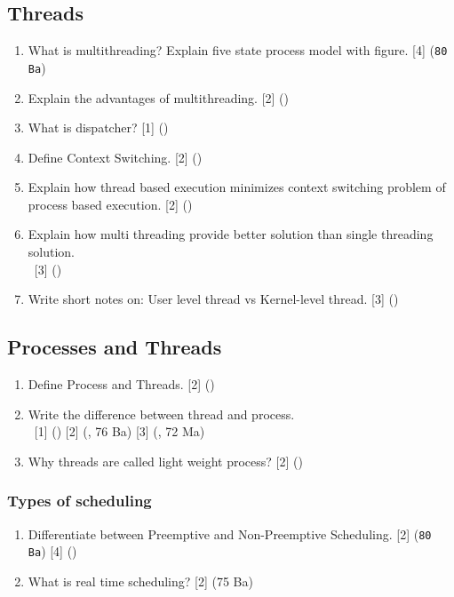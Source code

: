 \documentclass[12pt]{article}
\newcommand{\enter}{\\\textcolor{white}{1}}
\begin{document}
	\subsection{Threads}
		\begin{enumerate}[noitemsep, topsep = 0pt]
			\item What is multithreading? Explain five state process model with figure. \hfill [4] (\texttt{80 Ba})
			
			\item Explain the advantages of multithreading. \hfill [2] ()
			
			\item What is dispatcher? \hfill [1] ()
			
			\item Define Context Switching. \hfill [2] ()
			
			\item Explain how thread based execution minimizes context switching problem of process based execution. \hfill [2] ()
			
			\item Explain how multi threading provide better solution than single threading solution.
			\enter \hfill [3] ()

			\item Write short notes on: User level thread vs Kernel-level thread. \hfill [3] ()
		\end{enumerate}

	\subsection{Processes and Threads}
		\begin{enumerate}[noitemsep, topsep = 0pt]
			\item Define Process and Threads. \hfill [2] ()
			
			\item Write the difference between thread and process. 
			\enter\hfill [1] () [2] (, 76 Ba) [3] (, 72 Ma)
			
			\item Why threads are called light weight process? \hfill [2] ()
		\end{enumerate}

		\subsubsection{Types of scheduling}
			\begin{enumerate}[noitemsep, topsep = 0pt]
				\item Differentiate between Preemptive and Non-Preemptive Scheduling. \hfill [2] (\texttt{80 Ba}) [4] ()
				
				\item What is real time scheduling? \hfill [2] (75 Ba)
			\end{enumerate}
\end{document}
